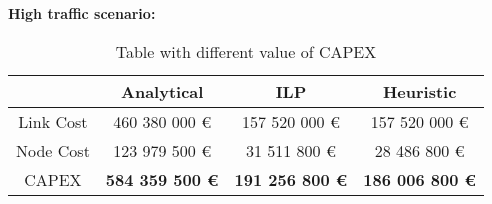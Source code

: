 \vspace{11pt}
\textbf{High traffic scenario:}\\

\begin{table}[h!]
\centering
\begin{tabular}{| c | c | c | c |}
 \hline
   & Analytical & ILP & Heuristic \\
 \hline\hline
 Link Cost & 460 380 000 \euro & 157 520 000 \euro & 157 520 000 \euro \\
 Node Cost & 123 979 500 \euro & 31 511 800 \euro & 28 486 800 \euro \\
 CAPEX & \textbf{584 359 500 \euro} & \textbf{191 256 800 \euro} & \textbf{186 006 800 \euro} \\
 \hline
\end{tabular}
\caption{Table with different value of CAPEX }
\label{table_comparative_transp_sur_ref_3}
\end{table}


